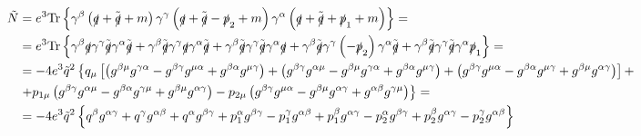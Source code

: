 \begin{align*}
\tilde{N} & = e^3 \mathrm{Tr} \left\lbrace \gamma^{\beta} \left( \slashed{q} + \tilde{\slashed{q}} + m \right) \gamma^{\gamma} \left( \slashed{q} + \tilde{\slashed{q}} - \slashed{p}_2 + m \right) \gamma^{\alpha} \left( \slashed{q} + \tilde{\slashed{q}} + \slashed{p}_1 + m \right) \right\rbrace = & \\
& = e^3 \mathrm{Tr} \left\lbrace \gamma^{\beta} \slashed{q} \gamma^{\gamma} \tilde{\slashed{q}} \gamma^{\alpha} \tilde{\slashed{q}} + \gamma^{\beta} \tilde{\slashed{q}} \gamma^{\gamma} \slashed{q} \gamma^{\alpha} \tilde{\slashed{q}} + \gamma^{\beta} \tilde{\slashed{q}} \gamma^{\gamma} \tilde{\slashed{q}} \gamma^{\alpha} \slashed{q} + \gamma^{\beta} \tilde{\slashed{q}} \gamma^{\gamma} \left( - \slashed{p}_2 \right) \gamma^{\alpha} \tilde{\slashed{q}} + \gamma^{\beta} \tilde{\slashed{q}} \gamma^{\gamma} \tilde{\slashed{q}} \gamma^{\alpha} \slashed{p}_1 \right\rbrace = & \\
& = - 4e^3 \tilde{q}^2 \left\lbrace q_{\mu} \left[ \left( g^{\beta\mu}g^{\gamma\alpha} - g^{\beta\gamma}g^{\mu\alpha} + g^{\beta\alpha}g^{\mu\gamma} \right) + \left( g^{\beta\gamma}g^{\alpha\mu} - g^{\beta\mu}g^{\gamma\alpha} + g^{\beta\alpha}g^{\mu\gamma} \right) + \left( g^{\beta\gamma}g^{\mu\alpha} - g^{\beta\alpha}g^{\mu\gamma} + g^{\beta\mu}g^{\alpha\gamma} \right) \right] + \right. & \\ 
& \left. + p_{1\mu} \left( g^{\beta\gamma}g^{\alpha\mu} - g^{\beta\alpha}g^{\gamma\mu} + g^{\beta\mu}g^{\alpha\gamma} \right) - p_{2\mu} \left( g^{\beta\gamma}g^{\mu\alpha} - g^{\beta\mu}g^{\alpha\gamma} + g^{\alpha\beta}g^{\gamma\mu} \right) \right\rbrace = & \\
& = -4e^3 \tilde{q}^2 \left\lbrace q^{\beta}g^{\alpha\gamma} + q^{\gamma}g^{\alpha\beta} + q^{\alpha}g^{\beta\gamma} + p_1^{\alpha}g^{\beta\gamma} - p_1^{\gamma}g^{\alpha\beta} + p_1^{\beta}g^{\alpha\gamma} - p_2^{\alpha}g^{\beta\gamma} + p_2^{\beta}g^{\alpha\gamma} - p_2^{\gamma}g^{\alpha\beta} \right\rbrace &
\end{align*}

